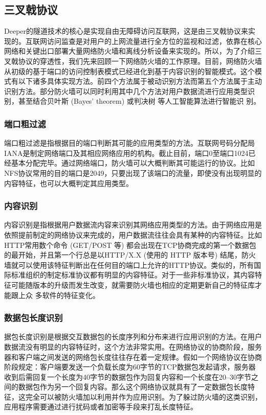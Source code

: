\documentclass[a4paper]{article}
\begin{document}
\subsection{三叉戟协议}
Deeper的隧道技术的核心是实现自由无障碍访问互联网，这是由三叉戟协议来实现的。互联网访问监查是对用户的上网流量进行全方位的监视和过滤\cite{internet-censorship}，依靠在核心网络和关键出口部署大量网络防火墙和离线分析设备来实现的。所以，为了介绍三叉戟协议的穿透性，我们先来回顾一下网络防火墙的工作原理。目前，网络防火墙从初级的基于端口的访问控制表模式已经进化到基于内容识别的智能模式。这个模式有以下诸多具体实现方法。前四个方法属于被动识别方法而第五个方法属于主动识别方法。部分防火墙可以同时利用其中几个方法对用户数据流进行应用类型识别，甚至结合贝叶斯 (Bayes’ theorem) \cite{russell2016artificial}或判决树\cite{rokach2008data} 等人工智能算法进行智能识
别。

\subsubsection{端口粗过滤}
端口粗过滤是指根据目的端口判断其可能的应用类型的方法。互联网号码分配局IANA\cite{iana}是制定网络端口及其相应网络应用的机构。截止目前，端口0至端口1024已经基本分配完毕\cite{list-port-number}。通过网络端口，防火墙可以大概判断其可能运行的协议。比如NFS协议常用的目的端口是2049，只要出现了该端口的流量，即使没有出现明显的内容特征，也可以大概判定其应用类型。 
\subsubsection{内容识别}
内容识别是指根据用户数据流内容来识别其网络应用类型的方法。由于网络应用是依照提前制定的网络协议来完成的，用户数据流往往会具有某种的内容特征。比如HTTP常用数个命令 (GET/POST 等) 都会出现在TCP协商完成的第一个数据包的最开始，并且第一个行总是以HTTP/X.X (使用的 HTTP 版本号) 结尾，防火墙就可以使用该特征判断出在任何目的端口上允许的HTTP协议。类似的，所有国际标准组织的制定标准协议都有明显的内容特征。对于一些非标准协议，其内容特征可能随版本的升级而发生改变，就需要防火墙也相应的定期更新自己的特征库才能跟上众
多软件的特征变化。

\subsubsection{数据包长度识别}
据包长度识别是根据交互数据包的长度序列和分布来进行应用识别的方法。在用户数据流没有明显的内容特征时，这个方法非常实用。在网络协议的协商阶段，服务器和客户端之间发送的网络包长度往往存在着一定规律。假如一个网络协议在协商阶段规定：客户端要发送一个负载长度为60字节的TCP数据包发起请求，服务器收到后需回复一个长度为40字节的数据包作为回复内容和一个长度在20–30字节之间的数据包作为另一个回复内容。那么这个网络协议就具有了一定数据包长度特征，这完全可以被防火墙加以利用并作为应用识别。为了躲过防火墙的这类识别，应用程序需要通过进行扰码或者加密等手段来打乱长度特征。
\end{document}
